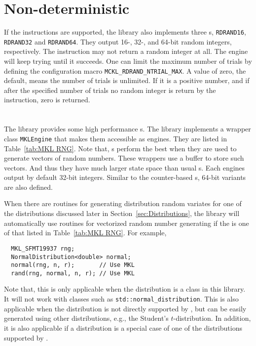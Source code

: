 \section{Non-deterministic \texorpdfstring{\protect\rng}{RNG}}
\label{sec:Non-deterministic RNG}

If the \rdrand instructions are supported, the library also implements three
\rng{}s, \verb|RDRAND16|, \verb|RDRAND32| and \verb|RDRAND64|. They output 16-,
32-, and 64-bit random integers, respectively. The \rdrand instruction may not
return a random integer at all. The \rng engine will keep trying until it
succeeds. One can limit the maximum number of trials by defining the
configuration macro \verb|MCKL_RDRAND_NTRIAL_MAX|. A value of zero, the
default, means the number of trials is unlimited. If it is a positive number,
and if after the specified number of trials no random integer is return by the
\rdrand instruction, zero is returned.

\section{\texorpdfstring{\protect\rng{} \protect\rng}{MKL RNG}}
\label{sec:MKL RNG}

The \mkl library provides some high performance \rng{}s. The library implements
a wrapper class \verb|MKLEngine| that makes them accessible as \cpp engines.
They are listed in Table~\ref{tab:MKL RNG}. Note that, \mkl{} \rng{}s perform
the best when they are used to generate vectors of random numbers. These
wrappers use a buffer to store such vectors. And thus they have much larger
state space than usual \rng{}s. Each \rng engines output by default 32-bit
integers. Similar to the counter-based \rng{}s, 64-bit variants are also
defined.

When there are \mkl routines for generating distribution random variates for
one of the distributions discussed later in Section~\ref{sec:Distributions},
the library will automatically use \mkl routines for vectorized random number
generating if the \rng{} is one of that listed in Table~\ref{tab:MKL RNG}. For
example,
\begin{Verbatim}
  MKL_SFMT19937 rng;
  NormalDistribution<double> normal;
  normal(rng, n, r);       // Use MKL
  rand(rng, normal, n, r); // Use MKL
\end{Verbatim}
Note that, this is only applicable when the distribution is a class in this
library. It will not work with classes such as \verb|std::normal_distribution|.
This is also applicable when the distribution is not directly supported by
\mkl, but can be easily generated using other distributions, e.g., the
Student's $t$-distribution. In addition, it is also applicable if a
distribution is a special case of one of the distributions supported by \mkl.

